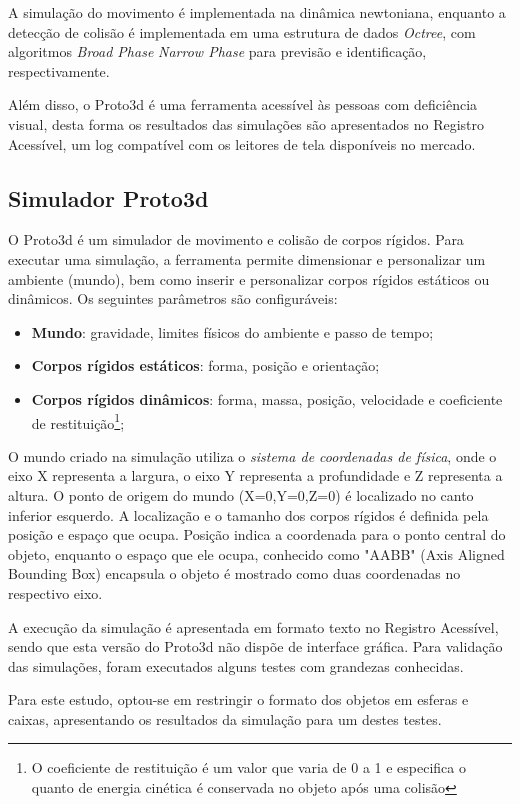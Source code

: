 \documentclass[12pt]{article}
\begin{document}
A simulação do movimento é implementada na dinâmica newtoniana, enquanto a detecção de colisão é implementada em uma estrutura de dados \emph{Octree}, com algoritmos \emph{Broad Phase} \emph{Narrow Phase} para previsão e identificação, respectivamente.

Além disso, o Proto3d é uma ferramenta acessível às pessoas com deficiência visual, desta forma os resultados das simulações são apresentados no Registro Acessível, um log compatível com os leitores de tela disponíveis no mercado.

\subsection{Simulador Proto3d}
O Proto3d é um simulador de movimento e colisão de corpos rígidos. Para executar uma simulação, a ferramenta permite dimensionar e personalizar um ambiente (mundo), bem como inserir e personalizar corpos rígidos estáticos ou dinâmicos. Os seguintes parâmetros são configuráveis:
\begin{itemize}
	\item \textbf{Mundo}: gravidade, limites físicos do ambiente e passo de tempo;
	\item \textbf{Corpos rígidos estáticos}: forma, posição e orientação;
	\item \textbf{Corpos rígidos dinâmicos}: forma, massa, posição, velocidade e coeficiente de restituição\footnote{O coeficiente de restituição é um valor que varia de 0 a 1 e especifica o quanto de energia cinética é conservada no objeto após uma colisão};
\end{itemize}

O mundo criado na simulação utiliza o \emph{sistema de coordenadas de física}, onde o eixo X representa a largura, o eixo Y representa a profundidade e Z representa a altura. O ponto de origem do mundo (X=0,Y=0,Z=0) é localizado no canto inferior esquerdo. A localização e o tamanho dos corpos rígidos é definida pela posição e espaço que ocupa. Posição indica a coordenada para o ponto central do objeto, enquanto o espaço que ele ocupa, conhecido como "AABB" (Axis Aligned Bounding Box) encapsula o objeto é mostrado como duas coordenadas no respectivo eixo.

A execução da simulação é apresentada em formato texto no Registro Acessível, sendo que esta versão do Proto3d não dispõe de interface gráfica. Para validação das simulações, foram executados alguns testes com grandezas conhecidas. 

Para este estudo, optou-se em restringir o formato dos objetos em esferas e caixas, apresentando os resultados da simulação para um destes testes.
\end{document}
